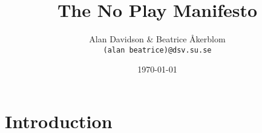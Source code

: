 \documentclass[a4paper,10pt]{article}
\title{The No Play Manifesto}
\author{Alan Davidson \& Beatrice Åkerblom\\ 
  \texttt{(alan beatrice)@dsv.su.se}}
\date{\today}
\begin{document}
\maketitle
\tableofcontents

\section{Introduction}
\end{document}
